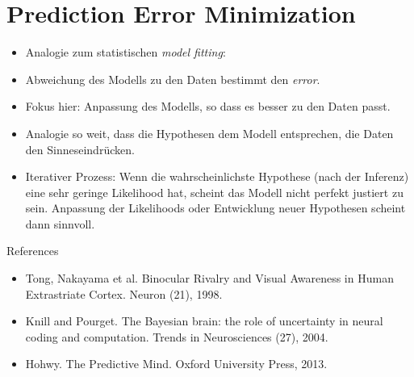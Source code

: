 \documentclass[11pt, handout]{beamer}
\begin{document}
\section{Prediction Error Minimization}
\begin{frame}
  \begin{itemize}[<+->]

  \item   Analogie zum statistischen \emph{model fitting}:
  \item Abweichung des Modells zu den Daten bestimmt den \emph{error}. 
  \item Fokus hier: Anpassung des Modells, so dass es besser zu den Daten passt.
  \item Analogie so weit, dass die Hypothesen dem Modell entsprechen, die Daten den Sinneseindrücken.
  \item Iterativer Prozess: Wenn die wahrscheinlichste Hypothese (nach der Inferenz) eine sehr geringe Likelihood hat, scheint das Modell nicht perfekt justiert zu sein. Anpassung der Likelihoods oder Entwicklung neuer Hypothesen scheint dann sinnvoll.
  \end{itemize}





\end{frame}


\begin{frame}

  {\Large References}

  \begin{itemize}
  \item Tong, Nakayama et al. Binocular Rivalry and Visual Awareness
    in Human Extrastriate Cortex. Neuron (21), 1998.
  \item Knill and Pourget. The Bayesian brain: the role of uncertainty
    in neural coding and computation. Trends in Neurosciences (27),
    2004.
  \item Hohwy. The Predictive Mind. Oxford University Press, 2013.

  \end{itemize}


\end{frame}
\end{document}
